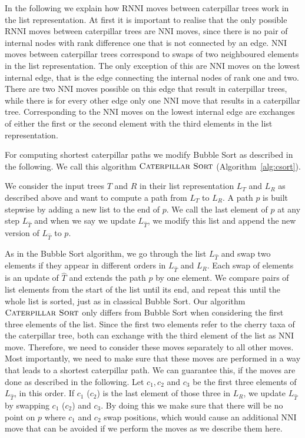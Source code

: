 \documentclass{amsart}
\newcommand{\nni}{\mathrm{NNI}}
\newcommand{\rnni}{\mathrm{RNNI}}
\newcommand{\csort}{\textsc{Caterpillar Sort}}
\begin{document}
In the following we explain how $\rnni$ moves between caterpillar trees work in the list representation.
At first it is important to realise that the only possible $\rnni$ moves between caterpillar trees are $\nni$ moves, since there is no pair of internal nodes with rank difference one that is not connected by an edge.
$\nni$ moves between caterpillar trees correspond to swaps of two neighboured elements in the list representation.
The only exception of this are $\nni$ moves on the lowest internal edge, that is the edge connecting the internal nodes of rank one and two.
There are two $\nni$ moves possible on this edge that result in caterpillar trees, while there is for every other edge only one $\nni$ move that results in a caterpillar tree.
Corresponding to the $\nni$ moves on the lowest internal edge are exchanges of either the first or the second element with the third elements in the list representation.

For computing shortest caterpillar paths we modify Bubble Sort as described in the following.
We call this algorithm $\csort$ (Algorithm~\ref{alg:csort}).

\todo{Description + Pseudo code $\csort$}
We consider the input trees $T$ and $R$ in their list representation $L_T$ and $L_R$ as described above and want to compute a path from $L_T$ to $L_R$.
A path $p$ is built stepwise by adding a new list to the end of $p$.
We call the last element of $p$ at any step $L_{\hat T}$ and when we say we update $L_{\hat T}$, we modify this list and append the new version of $L_{\hat T}$ to $p$.

As in the Bubble Sort algorithm, we go through the list $L_{\hat T}$ and swap two elements if they appear in different orders in $L_{\hat T}$ and $L_R$.
Each swap of elements is an update of $\hat T$ and extends the path $p$ by one element.
We compare pairs of list elements from the start of the list until its end, and repeat this until the whole list is sorted, just as in classical Bubble Sort.
Our algorithm $\csort$ only differs from Bubble Sort when considering the first three elements of the list.
Since the first two elements refer to the cherry taxa of the caterpillar tree, both can exchange with the third element of the list as $\nni$ move.
Therefore, we need to consider these moves separately to all other moves.
Most importantly, we need to make sure that these moves are performed in a way that leads to a shortest caterpillar path.
We can guarantee this, if the moves are done as described in the following.
Let $c_1, c_2$ and $c_3$ be the first three elements of $L_{\hat T}$, in this order.
If $c_1$ ($c_2$) is the last element of those three in $L_R$, we update $L_{\hat T}$ by swapping $c_1$ ($c_2$) and $c_3$.
By doing this we make sure that there will be no point on $p$ where $c_1$ and $c_2$ swap positions, which would cause an additional $\nni$ move that can be avoided if we perform the moves as we describe them here.
\end{document}
